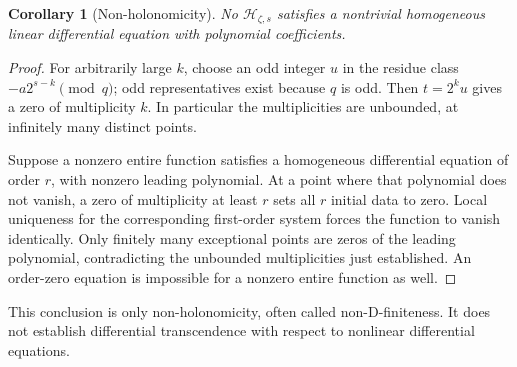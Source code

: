 \documentclass[11pt,letterpaper]{article}
\numberwithin{equation}{section}
\newtheorem{corollary}[theorem]{Corollary}
\theoremstyle{definition}
\theoremstyle{remark}
\newcommand{\Hp}{\mathcal H}
\begin{document}
\begin{corollary}[Non-holonomicity]
No \(\Hp_{\zeta,s}\) satisfies a nontrivial homogeneous linear differential equation with polynomial coefficients.
\end{corollary}
\begin{proof}
For arbitrarily large \(k\), choose an odd integer \(u\) in the residue class \(-a2^{s-k}\pmod q\); odd representatives exist because \(q\) is odd. Then \(t=2^ku\) gives a zero of multiplicity \(k\). In particular the multiplicities are unbounded, at infinitely many distinct points.

Suppose a nonzero entire function satisfies a homogeneous differential equation of order \(r\), with nonzero leading polynomial. At a point where that polynomial does not vanish, a zero of multiplicity at least \(r\) sets all \(r\) initial data to zero. Local uniqueness for the corresponding first-order system forces the function to vanish identically. Only finitely many exceptional points are zeros of the leading polynomial, contradicting the unbounded multiplicities just established. An order-zero equation is impossible for a nonzero entire function as well.
\end{proof}

This conclusion is only non-holonomicity, often called non-D-finiteness. It does not establish differential transcendence with respect to nonlinear differential equations.
\end{document}
